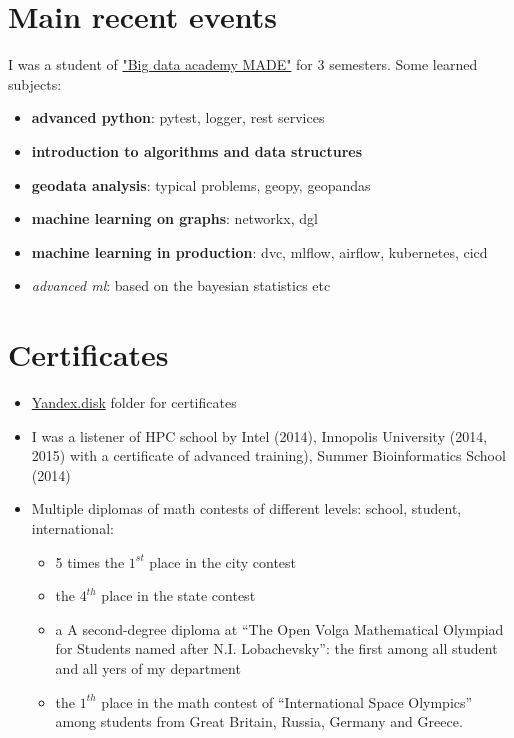 \documentclass[letterpaper]{twentysecondcv} %
\begin{document}

\section{Main recent events}


I was a student of \href{https://data.vk.company/}{"Big data academy MADE"} for 3 semesters. Some learned subjects:
    {\begin{itemize}
        \item \textbf{advanced python}: pytest, logger, rest services
        \item \textbf{introduction to algorithms and data structures}
        \item \textbf{geodata analysis}: typical problems, geopy, geopandas
        \item \textbf{machine learning on graphs}: networkx, dgl
        \item \textbf{machine learning in production}: dvc, mlflow, airflow, kubernetes, cicd
        \item \emph{advanced ml}: based on the bayesian statistics etc
    \end{itemize}
    }



\section{Certificates}
    {\begin{itemize}
        \item \href{https://yadi.sk/d/aSyzcZ44-_l-8w?w=1}{Yandex.disk} folder for certificates
        \item I was a listener of HPC school by Intel (2014), Innopolis University (2014, 2015) with a certificate of advanced training),
        Summer Bioinformatics School (2014)
        \item Multiple diplomas of math contests of different levels: school, student, international:
            {\begin{itemize}
            \item 5 times the $1^{st}$ place in the city contest
            \item the $4^{th}$ place in the state contest
            \item a A second-degree diploma at ``The Open Volga Mathematical Olympiad for Students named after N.I. Lobachevsky'': the first among all student and all yers of my department
            \item the $1^{th}$ place in the math contest of ``International Space Olympics'' among students from Great Britain, Russia, Germany and Greece.
            \end{itemize}}

    \end{itemize}}
\end{document}
